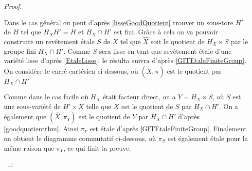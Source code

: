 \begin{proof}
	\begin{center}
	\end{center}

Dans le cas général on peut d'après \ref{lisseGoodQuotient} trouver un sous-tore $H'$ de $H$ tel que $H_XH'=H$ et $H_X\cap H'$ est fini. Grâce à cela on va pouvoir construire un revêtement étale $S$ de $X$ tel que $\widehat{X}$ soit le quotient de $H_X\times S$ par le groupe fini $H_X\cap H'$. Comme $S$ sera lisse en tant que revêtement étale d'une variété lisse d'après \ref{EtaleLisse}, le résulta suivra d'après \ref{GITEtaleFiniteGroup}. On considère le carré cartésien ci-dessous, où $(\widetilde{X},\pi)$ est le quotient par $H_X\cap H'$

	\begin{center}
	\end{center}

Comme dans le cas facile où $H_X$ était facteur direct, on a $Y=H_X\times S$, où $S$ est une sous-variété de $H'\times X$ telle que $X$ est le quotient de $S$ par $H_X\cap H'$. On a également que $(\widehat{X}, \pi_Y)$ est le quotient de $Y$ par $H_X\cap H'$ d'après \ref{goodquotientthm}. Ainsi $\pi_Y$ est étale d'après \ref{GITEtaleFiniteGroup}. Finalement on obtient le diagramme commutatif ci-dessous, où $\pi_S$ est également étale pour la même raison que $\pi_Y$, ce qui finit la preuve.

	\begin{center}
	\end{center}


\end{proof}

